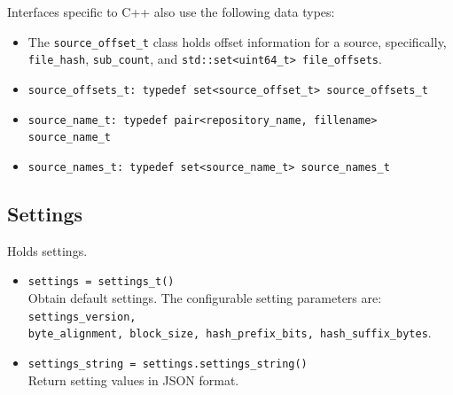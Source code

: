 \documentclass[11pt,fleqn]{article} %
\begin{document}
Interfaces specific to C++ also use the following data types:
\begin{itemize}
\item The \verb+source_offset_t+ class holds offset information for a source, specifically, \verb+file_hash+, \verb+sub_count+, and \verb+std::set<uint64_t> file_offsets+.
\item \verb+source_offsets_t: typedef set<source_offset_t> source_offsets_t+
\item \verb+source_name_t: typedef pair<repository_name, fillename> source_name_t+
\item \verb+source_names_t: typedef set<source_name_t> source_names_t+
\end{itemize}

\subsection{Settings}
Holds \hdb settings.

\begin{itemize}
\item \verb+settings = settings_t()+\\
Obtain default settings. The configurable setting parameters are: \verb+settings_version,+\\
\verb+byte_alignment, block_size, hash_prefix_bits, hash_suffix_bytes+.
\item \verb+settings_string = settings.settings_string()+\\
Return setting values in JSON format.
\end{itemize}
\end{document}
